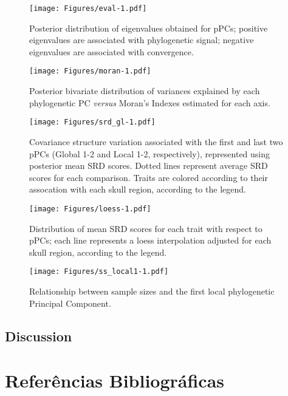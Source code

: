 \documentclass[12pt,twoside]{report}
\begin{document}
\begin{figure}[htbp]
\centering
\texttt{[image: Figures/eval-1.pdf]}
\caption{Posterior distribution of eigenvalues obtained for pPCs;
positive eigenvalues are associated with phylogenetic signal; negative
eigenvalues are associated with convergence. \label{fig:eval}}
\end{figure}

\begin{figure}[htbp]
\centering
\texttt{[image: Figures/moran-1.pdf]}
\caption{Posterior bivariate distribution of variances explained by each
phylogenetic PC \emph{versus} Moran's Indexes estimated for each axis.
\label{fig:moran}}
\end{figure}

\begin{figure}[htbp]
\centering
\texttt{[image: Figures/srd\_gl-1.pdf]}
\caption{Covariance structure variation associated with the first and
last two pPCs (Global 1-2 and Local 1-2, respectively), represented
using posterior mean SRD scores. Dotted lines represent average SRD
scores for each comparison. Traits are colored according to their
assocation with each skull region, according to the legend.
\label{fig:srd_gl}}
\end{figure}

\begin{figure}[htbp]
\centering
\texttt{[image: Figures/loess-1.pdf]}
\caption{Distribution of mean SRD scores for each trait with respect to
pPCs; each line represents a loess interpolation adjusted for each skull
region, according to the legend. \label{fig:loess}}
\end{figure}

\begin{figure}[htbp]
\centering
\texttt{[image: Figures/ss\_local1-1.pdf]}
\caption{Relationship between sample sizes and the first local
phylogenetic Principal Component. \label{fig:ss_local1}}
\end{figure}

\section{Discussion}\label{discussion-2}

\def\sectionautorefname{Seção} \def\chapterautorefname{Capítulo}
\def\figureautorefname{Figura} \def\tableautorefname{Tabela}


\pagestyle{plain}

\chapter*{Referências Bibliográficas}
\end{document}

